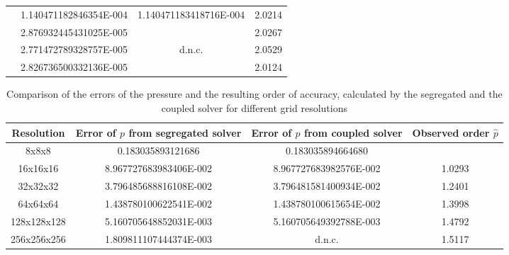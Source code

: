 \begin{table}[h!]
\begin{tabular}{cccc}
    \rowcolor{tud0a} \multirow{-3}{*}{128x128x128}& 1.140471182846354E-004 & 1.140471183418716E-004 & 2.0214  \\ %
    \rowcolor{black!00}\multirow{3}{*}{}             & 2.876932445431025E-005 & & 2.0267 \\
    \rowcolor{black!00}                              & 2.771472789328757E-005 & d.n.c. & 2.0529 \\
    \rowcolor{black!00} \multirow{-3}{*}{256x256x256}& 2.826736500332136E-005 & & 2.0124 \\ %
  \end{tabular}
  \label{tab:velorder}
\end{table}

\begin{table}[h!]\centering
{}
  \caption{Comparison of the errors of the pressure and the resulting order of accuracy, calculated by the segregated and the coupled solver for different grid resolutions}
  \begin{tabular}{cccc}\toprule
    Resolution & Error of \(p\) from segregated solver & Error of \(p\) from coupled solver & Observed order \(\hat{p}\) \\
    \midrule
    \rowcolor{tud0a} 8x8x8       & 0.183035893121686      &  0.183035894664680      &        \\%
    \rowcolor{black!00} 16x16x16    & 8.967727683983406E-002 &  8.967727683982576E-002 & 1.0293 \\%
    \rowcolor{tud0a} 32x32x32    & 3.796485688816108E-002 &  3.796481581400934E-002 & 1.2401 \\%
    \rowcolor{black!00} 64x64x64    & 1.438780100622541E-002 &  1.438780100615654E-002 & 1.3998 \\%
    \rowcolor{tud0a} 128x128x128 & 5.160705648852031E-003 &  5.160705649392788E-003 & 1.4792 \\%
    \rowcolor{black!00} 256x256x256 & 1.809811107444374E-003 &  d.n.c.                 & 1.5117 \\%
  \end{tabular}
  \label{tab:pressorder}
\end{table}

